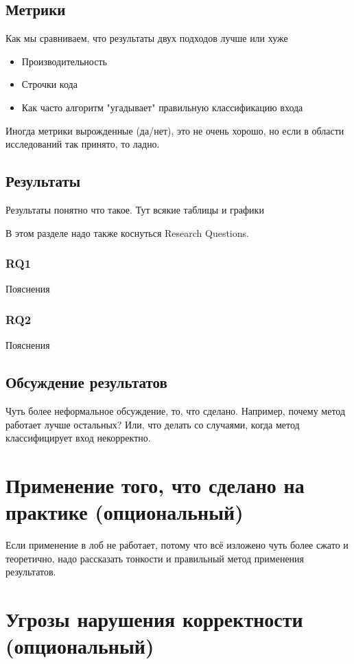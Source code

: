 \subsection{Метрики}

Как мы сравниваем, что результаты двух подходов лучше или хуже
\begin{itemize}
\item Производительность
\item Строчки кода
\item Как часто алгоритм "угадывает" правильную классификацию входа
\end{itemize}

Иногда метрики вырожденные (да/нет), это не очень хорошо, но если в области исследований так принято, то ладно.

\subsection{Результаты}
Результаты понятно что такое. Тут всякие таблицы и графики

В этом разделе надо также коснуться Research Questions.

\subsubsection{RQ1} Пояснения
\subsubsection{RQ2} Пояснения

\subsection{Обсуждение результатов}

Чуть более неформальное обсуждение, то, что сделано. Например, почему метод работает лучше остальных? Или, что делать со случаями, когда метод классифицирует вход некорректно.

\section{Применение того, что сделано на практике (опциональный)}

Если применение в лоб не работает, потому что всё изложено чуть более сжато и теоретично, надо рассказать тонкости и правильный метод применения результатов. 

\section{Угрозы нарушения корректности (опциональный)}

